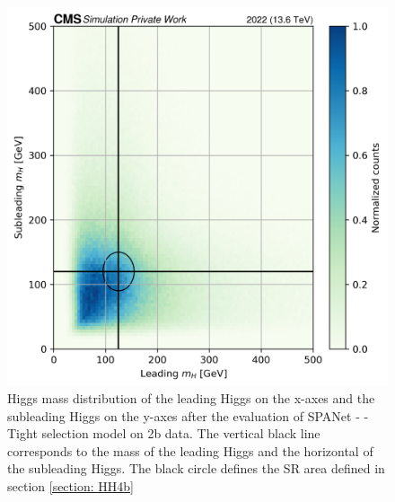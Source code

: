 \begin{figure}
    \centering
    \includegraphics[width=0.6\linewidth]{Images/6.Improving/kappa lambda/mass dist best model.png}
    \caption{Higgs mass distribution of the leading Higgs on the x-axes and the subleading Higgs on the y-axes after the evaluation of  SPANet - \kl - Tight selection model on 2b data. The vertical black line corresponds to the mass of the leading Higgs and the horizontal of the subleading Higgs. The black circle defines the SR area defined in section \ref{section: HH4b}}
    \label{fig: 2D mass dist kl}
\end{figure}

